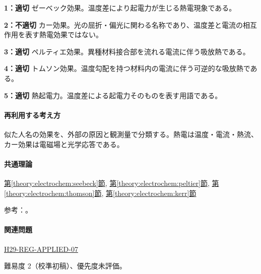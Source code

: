\noindent\textbf{1：適切} ゼーベック効果。温度差により起電力が生じる熱電現象である。\par

\noindent\textbf{2：不適切} カー効果。光の屈折・偏光に関わる名称であり、温度差と電流の相互作用を表す熱電効果ではない。\par

\noindent\textbf{3：適切} ペルティエ効果。異種材料接合部を流れる電流に伴う吸放熱である。\par

\noindent\textbf{4：適切} トムソン効果。温度勾配を持つ材料内の電流に伴う可逆的な吸放熱である。\par

\noindent\textbf{5：適切} 熱起電力。温度差による起電力そのものを表す用語である。\par

\paragraph{再利用する考え方} 似た人名の効果を、外部の原因と観測量で分類する。熱電は温度・電流・熱流、カー効果は電磁場と光学応答である。

\paragraph{共通理論} \hyperref[theory:electrochem:seebeck]{第\ref*{theory:electrochem:seebeck}節}, \hyperref[theory:electrochem:peltier]{第\ref*{theory:electrochem:peltier}節}, \hyperref[theory:electrochem:thomson]{第\ref*{theory:electrochem:thomson}節}, \hyperref[theory:electrochem:kerr]{第\ref*{theory:electrochem:kerr}節}

\par 参考：\cite{mit_thermoelectric2024,mit_kerr_calendar2005}。

\paragraph{関連問題} \hyperref[q:h29-reg-applied-07]{H29-REG-APPLIED-07}

\par 難易度 2（校準初稿）、優先度未評価。
